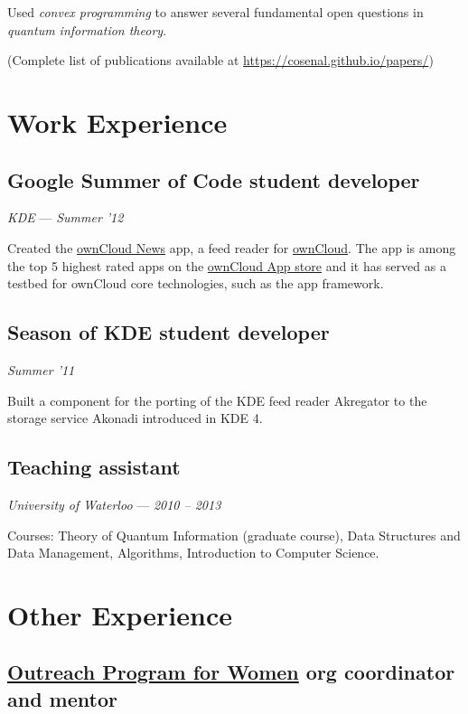 \documentclass[]{article}
\begin{document}
Used \emph{convex programming} to answer several fundamental open
questions in \emph{quantum information theory}.

(Complete list of publications available at
\url{https://cosenal.github.io/papers/})

\section{Work Experience}\label{work-experience}

\subsection{Google Summer of Code student
developer}\label{google-summer-of-code-student-developer}

\emph{KDE} --- \emph{Summer '12}

Created the \href{https://github.com/owncloud/news}{ownCloud News} app,
a feed reader for \href{http://owncloud.org/}{ownCloud}. The app is
among the top 5 highest rated apps on the
\href{http://apps.owncloud.com/index.php?xsortmode=high}{ownCloud App
store} and it has served as a testbed for ownCloud core technologies,
such as the app framework.

\subsection{Season of KDE student
developer}\label{season-of-kde-student-developer}

\emph{Summer '11}

Built a component for the porting of the KDE feed reader Akregator to
the storage service Akonadi introduced in KDE 4.

\subsection{Teaching assistant}\label{teaching-assistant}

\emph{University of Waterloo} --- \emph{2010 -- 2013}

Courses: Theory of Quantum Information (graduate course), Data
Structures and Data Management, Algorithms, Introduction to Computer
Science.

\section{Other Experience}\label{other-experience}

\subsection{\href{https://gnome.org/opw/}{Outreach Program for Women}
org coordinator and
mentor}\label{outreach-program-for-womenopw-org-coordinator-and-mentor}
\end{document}
